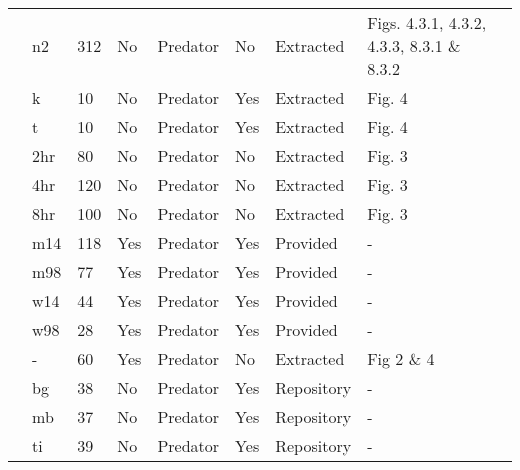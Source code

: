 \begin{longtable}{lllllllll}
\citet{Uttley:1980aa}&n2&312&No&Predator&No&Extracted&Figs. 4.3.1, 4.3.2, 4.3.3, 8.3.1 \& 8.3.2&\citet{Novak:2020aa}\tabularnewline
\citet{Vahl:2005aa}&k&10&No&Predator&Yes&Extracted&Fig. 4&\citet{Novak:2020aa}\tabularnewline
\citet{Vahl:2005aa}&t&10&No&Predator&Yes&Extracted&Fig. 4&\citet{Novak:2020aa}\tabularnewline
\citet{Von-Westernhagen:1976aa}&2hr&80&No&Predator&No&Extracted&Fig. 3&\citet{Novak:2020aa}\tabularnewline
\citet{Von-Westernhagen:1976aa}&4hr&120&No&Predator&No&Extracted&Fig. 3&\citet{Novak:2020aa}\tabularnewline
\citet{Von-Westernhagen:1976aa}&8hr&100&No&Predator&No&Extracted&Fig. 3&\citet{Novak:2020aa}\tabularnewline
\citet{Vucetich:2002aa}&m14&118&Yes&Predator&Yes&Provided&-&\tabularnewline
\citet{Vucetich:2002aa}&m98&77&Yes&Predator&Yes&Provided&-&\tabularnewline
\citet{Vucetich:2002aa}&w14&44&Yes&Predator&Yes&Provided&-&\tabularnewline
\citet{Vucetich:2002aa}&w98&28&Yes&Predator&Yes&Provided&-&\tabularnewline
\citet{Walde:1984aa}&-&60&Yes&Predator&No&Extracted&Fig 2 \& 4&\citet{Novak:2020aa}\tabularnewline
\citet{Wasserman:2016aa}&bg&38&No&Predator&Yes&Repository&-&\citet{Wasserman:2016ab}\tabularnewline
\citet{Wasserman:2016aa}&mb&37&No&Predator&Yes&Repository&-&\citet{Wasserman:2016ab}\tabularnewline
\citet{Wasserman:2016aa}&ti&39&No&Predator&Yes&Repository&-&\citet{Wasserman:2016ab}\tabularnewline
\hline
\end{longtable}
